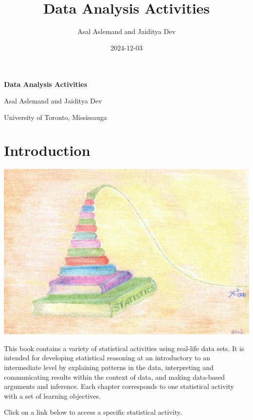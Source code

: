 \documentclass[oneside,openany]{book}
\title{Data Analysis Activities}
\author{Asal Aslemand and Jaiditya Dev}
\date{2024-12-03}
\begin{document}
\begin{titlepage}
    \centering
    {\Huge \bfseries Data Analysis Activities\par}
    \vspace{2cm}
    {\Large Asal Aslemand and Jaiditya Dev\par}
    {\Large University of Toronto, Mississauga}
    \vfill
\end{titlepage}

\newpage
{
\setcounter{tocdepth}{2}
\tableofcontents
}
\newpage
\chapter*{Introduction}


\begin{center}\includegraphics[width=0.65\linewidth]{Chi-square} \end{center}

This book contains a variety of statistical activities using real-life data sets. It is intended for developing statistical reasoning at an introductory to an intermediate level by explaining patterns in the data, interpreting and communicating results within the context of data, and making data-based arguments and inference. Each chapter corresponds to one statistical activity with a set of learning objectives.

Click on a link below to access a specific statistical activity.
\end{document}
